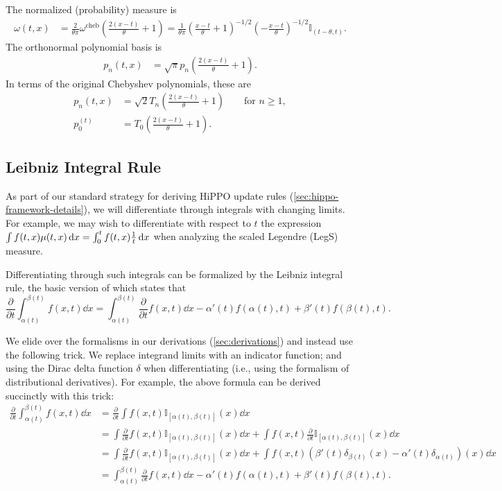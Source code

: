 \documentclass[../hippo.tex]{subfiles}
\begin{document}
The normalized (probability) measure is
\begin{align*}%
  \omega(t, x) &= \frac{2}{\theta\pi} \omega^{\mathrm{cheb}}\left( \frac{2(x-t)}{\theta} + 1 \right)
  = \frac{1}{\theta\pi} \left( \frac{x-t}{\theta} + 1 \right)^{-1/2} \left( -\frac{x-t}{\theta} \right)^{-1/2}
  \mathbb{I}_{(t-\theta, t)}
  .
\end{align*}
The orthonormal polynomial basis is
\begin{align*}%
  p_n(t, x) &= \sqrt\pi p_n\left( \frac{2(x-t)}{\theta} + 1 \right)
  .
\end{align*}
In terms of the original Chebyshev polynomials, these are
\begin{align*}%
  p_n(t, x) &= \sqrt{2} T_n\left( \frac{2(x-t)}{\theta} + 1 \right) \qquad \text{for } n \geq 1,
  \\
  p_0^{(t)} &= T_0\left( \frac{2(x-t)}{\theta} + 1 \right).
\end{align*}


\subsection{Leibniz Integral Rule}
As part of our standard strategy for deriving HiPPO update rules (\cref{sec:hippo-framework-details}),
we will differentiate through integrals with changing limits.
For example, we may wish to differentiate with respect to $t$ the expression
$\int f(t, x) \mu(t, x) \mathop{}\!\mathrm{d} x = \int_0^t f(t, x) \frac{1}{t} \mathop{}\!\mathrm{d} x$
when analyzing the scaled Legendre (LegS) measure.

Differentiating through such integrals can be formalized by the Leibniz integral rule,
the basic version of which states that
\[
  \frac{\partial}{\partial t} \int_{\alpha(t)}^{\beta(t)} f(x, t) \dd x
  = \int_{\alpha(t)}^{\beta(t)} \frac{\partial}{\partial t} f(x, t) \dd x
  - \alpha'(t) f(\alpha(t), t) + \beta'(t) f(\beta(t), t).
\]

We elide over the formalisms in our derivations (\cref{sec:derivations}) and
instead use the following trick.
We replace integrand limits with an indicator function;
and using the Dirac delta function $\delta$ when differentiating (i.e., using the formalism
of distributional derivatives).
For example, the above formula can be derived succinctly with this trick:
\begin{align*}%
  \frac{\partial}{\partial t} \int_{\alpha(t)}^{\beta(t)} f(x, t) \dd x
  &= \frac{\partial}{\partial t} \int f(x, t) \mathbb{I}_{[\alpha(t), \beta(t)]}(x) \dd x
  \\
  &= \int \frac{\partial}{\partial t} f(x, t) \mathbb{I}_{[\alpha(t), \beta(t)]}(x) \dd x
  + \int f(x, t) \frac{\partial}{\partial t} \mathbb{I}_{[\alpha(t), \beta(t)]}(x) \dd x
  \\
  &= \int \frac{\partial}{\partial t} f(x, t) \mathbb{I}_{[\alpha(t), \beta(t)]}(x) \dd x
  + \int f(x, t) (\beta'(t) \delta_{\beta(t)}(x) - \alpha'(t) \delta_{\alpha(t)})(x) \dd x
  \\
  &= \int_{\alpha(t)}^{\beta(t)} \frac{\partial}{\partial t} f(x, t) \dd x
  - \alpha'(t) f(\alpha(t), t) + \beta'(t) f(\beta(t), t)
  .
\end{align*}
\end{document}
